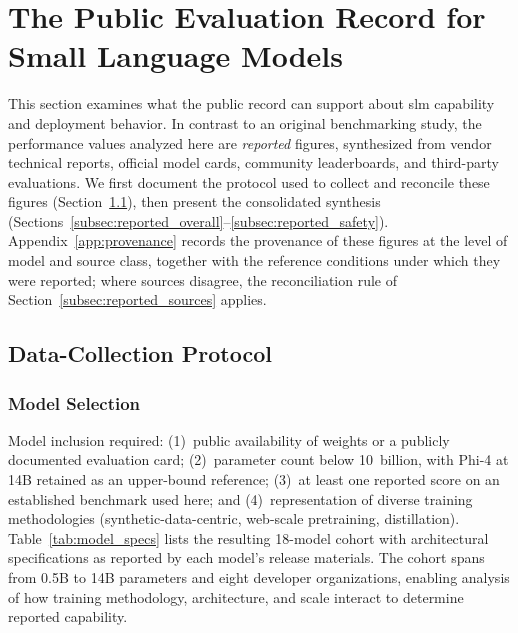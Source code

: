 
\section{The Public Evaluation Record for Small Language Models}
\label{sec:reported}

This section examines what the public record can support about \gls{slm} capability and deployment
behavior. In contrast to an original benchmarking study,
the performance values analyzed here are \emph{reported} figures, synthesized
from vendor technical reports, official model cards, community leaderboards, and
third-party evaluations. We first document the protocol used to collect and
reconcile these figures (Section~\ref{subsec:reported_protocol}), then present
the consolidated synthesis (Sections~\ref{subsec:reported_overall}--\ref{subsec:reported_safety}).
Appendix~\ref{app:provenance} records the provenance of these figures at the
level of model and source class, together with the reference conditions under
which they were reported; where sources disagree, the reconciliation rule of
Section~\ref{subsec:reported_sources} applies.

\subsection{Data-Collection Protocol}
\label{subsec:reported_protocol}

\subsubsection{Model Selection}
\label{subsec:reported_model_selection}
Model inclusion required: (1)~public availability of weights or a publicly
documented evaluation card; (2)~parameter count below 10~billion, with Phi-4 at
14B retained as an upper-bound reference; (3)~at least one reported score on an
established benchmark used here; and (4)~representation of diverse training
methodologies (synthetic-data-centric, web-scale pretraining, distillation).
Table~\ref{tab:model_specs} lists the resulting 18-model cohort with
architectural specifications as reported by each model's release materials. The
cohort spans from 0.5B to 14B parameters and eight developer organizations,
enabling analysis of how training methodology, architecture, and scale interact
to determine reported capability.

